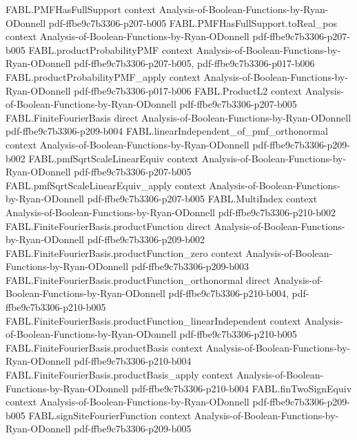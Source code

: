 \begin{theorem}
\proofstep
  {FABL.PMFHasFullSupport}
  {context}
  {Analysis-of-Boolean-Functions-by-Ryan-ODonnell}
  {pdf-ffbe9c7b3306-p207-b005}
\proofstep
  {FABL.PMFHasFullSupport.toReal_pos}
  {context}
  {Analysis-of-Boolean-Functions-by-Ryan-ODonnell}
  {pdf-ffbe9c7b3306-p207-b005}
\proofstep
  {FABL.productProbabilityPMF}
  {context}
  {Analysis-of-Boolean-Functions-by-Ryan-ODonnell}
  {pdf-ffbe9c7b3306-p207-b005,
    pdf-ffbe9c7b3306-p017-b006}
\proofstep
  {FABL.productProbabilityPMF_apply}
  {context}
  {Analysis-of-Boolean-Functions-by-Ryan-ODonnell}
  {pdf-ffbe9c7b3306-p017-b006}
\proofstep
  {FABL.ProductL2}
  {context}
  {Analysis-of-Boolean-Functions-by-Ryan-ODonnell}
  {pdf-ffbe9c7b3306-p207-b005}
\proofstep
  {FABL.FiniteFourierBasis}
  {direct}
  {Analysis-of-Boolean-Functions-by-Ryan-ODonnell}
  {pdf-ffbe9c7b3306-p209-b004}
\proofstep
  {FABL.linearIndependent_of_pmf_orthonormal}
  {context}
  {Analysis-of-Boolean-Functions-by-Ryan-ODonnell}
  {pdf-ffbe9c7b3306-p209-b002}
\proofstep
  {FABL.pmfSqrtScaleLinearEquiv}
  {context}
  {Analysis-of-Boolean-Functions-by-Ryan-ODonnell}
  {pdf-ffbe9c7b3306-p207-b005}
\proofstep
  {FABL.pmfSqrtScaleLinearEquiv_apply}
  {context}
  {Analysis-of-Boolean-Functions-by-Ryan-ODonnell}
  {pdf-ffbe9c7b3306-p207-b005}
\proofstep
  {FABL.MultiIndex}
  {context}
  {Analysis-of-Boolean-Functions-by-Ryan-ODonnell}
  {pdf-ffbe9c7b3306-p210-b002}
\proofstep
  {FABL.FiniteFourierBasis.productFunction}
  {direct}
  {Analysis-of-Boolean-Functions-by-Ryan-ODonnell}
  {pdf-ffbe9c7b3306-p209-b002}
\proofstep
  {FABL.FiniteFourierBasis.productFunction_zero}
  {context}
  {Analysis-of-Boolean-Functions-by-Ryan-ODonnell}
  {pdf-ffbe9c7b3306-p209-b003}
\proofstep
  {FABL.FiniteFourierBasis.productFunction_orthonormal}
  {direct}
  {Analysis-of-Boolean-Functions-by-Ryan-ODonnell}
  {pdf-ffbe9c7b3306-p210-b004,
    pdf-ffbe9c7b3306-p210-b005}
\proofstep
  {FABL.FiniteFourierBasis.productFunction_linearIndependent}
  {context}
  {Analysis-of-Boolean-Functions-by-Ryan-ODonnell}
  {pdf-ffbe9c7b3306-p210-b005}
\proofstep
  {FABL.FiniteFourierBasis.productBasis}
  {context}
  {Analysis-of-Boolean-Functions-by-Ryan-ODonnell}
  {pdf-ffbe9c7b3306-p210-b004}
\proofstep
  {FABL.FiniteFourierBasis.productBasis_apply}
  {context}
  {Analysis-of-Boolean-Functions-by-Ryan-ODonnell}
  {pdf-ffbe9c7b3306-p210-b004}
\proofstep
  {FABL.finTwoSignEquiv}
  {context}
  {Analysis-of-Boolean-Functions-by-Ryan-ODonnell}
  {pdf-ffbe9c7b3306-p209-b005}
\proofstep
  {FABL.signSiteFourierFunction}
  {context}
  {Analysis-of-Boolean-Functions-by-Ryan-ODonnell}
  {pdf-ffbe9c7b3306-p209-b005}

\end{theorem}

